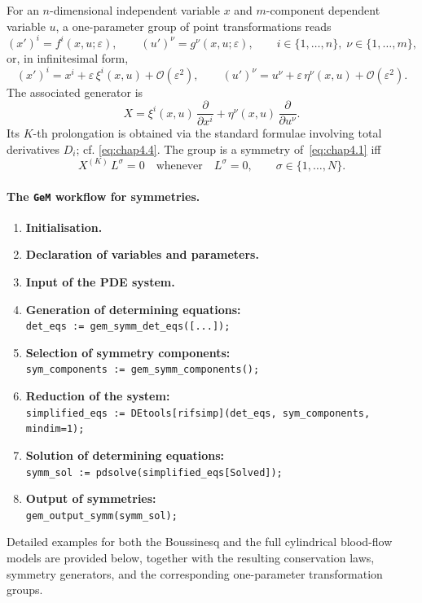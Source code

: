 \documentclass[alpha-refs, 12pt]{wiley-article}
\newcommand{\eps}{\varepsilon}
\newcommand{\pd}[2]{\frac{\partial #1}{\partial #2}}
\begin{document}
For an $n$-dimensional independent variable $x$ and $m$-component dependent variable $u$, a one-parameter group of point transformations reads
\[
  (x')^{i}=f^{i}(x,u;\eps), \qquad
  (u')^{\nu}=g^{\nu}(x,u;\eps),
  \qquad
  i \in \{1,\dots,n\},\;
  \nu \in \{1,\dots,m\},
\]
or, in infinitesimal form,
\[
  (x')^{i}=x^{i}+\eps\,\xi^{i}(x,u)+\mathcal{O}(\eps^{2}),\qquad
  (u')^{\nu}=u^{\nu}+\eps\,\eta^{\nu}(x,u)+\mathcal{O}(\eps^{2}).
\]
The associated generator is
\[
  X=\xi^{i}(x,u)\,\pd{}{x^{i}}+\eta^{\nu}(x,u)\,\pd{}{u^{\nu}}.
\]
Its $K$-th prolongation is obtained via the standard formulae involving total derivatives $D_{i}$; cf. \eqref{eq:chap4.4}. The group is a symmetry of~\eqref{eq:chap4.1} iff
\[
  X^{(K)}\,L^{\sigma}=0
  \quad\text{whenever}\quad
  L^{\sigma}=0,
  \qquad \sigma \in \{1,\dots,N\}.
\]

\paragraph{The \texttt{GeM} workflow for symmetries.}
\begin{enumerate}[label=(\roman*)]
  \item \textbf{Initialisation.}
  \item \textbf{Declaration of variables and parameters.}
  \item \textbf{Input of the PDE system.}
  \item \textbf{Generation of determining equations:}\\
        \verb|det_eqs := gem_symm_det_eqs([...]);|
  \item \textbf{Selection of symmetry components:}\\
        \verb|sym_components := gem_symm_components();|
  \item \textbf{Reduction of the system:}\\
        \verb|simplified_eqs := DEtools[rifsimp](det_eqs, sym_components, mindim=1);|
  \item \textbf{Solution of determining equations:}\\
        \verb|symm_sol := pdsolve(simplified_eqs[Solved]);|
  \item \textbf{Output of symmetries:}\\
        \verb|gem_output_symm(symm_sol);|
\end{enumerate}

Detailed examples for both the Boussinesq and the full cylindrical blood-flow models are provided below, together with the resulting conservation laws, symmetry generators, and the corresponding one-parameter transformation groups.
\end{document}
